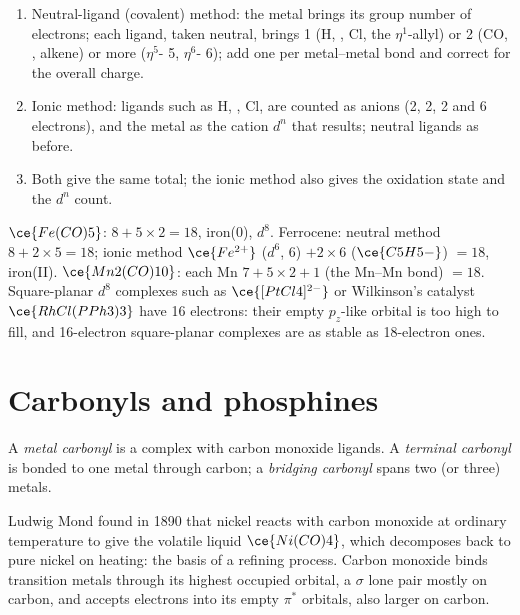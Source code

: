 \begin{method}\label{met:b3:organometallic-bonding:count}
\begin{enumerate}
  \item Neutral-ligand (covalent) method: the metal brings its group number of
        electrons; each ligand, taken neutral, brings 1 (H, , Cl, the
        $\eta^1$-allyl) or 2 (CO, , alkene) or more ($\eta^5$- 5, $\eta^6$- 6); add one per
        metal--metal bond and correct for the overall charge.
  \item Ionic method: ligands such as H, , Cl,  are counted as anions (2, 2,
        2 and 6 electrons), and the metal as the cation $d^n$ that results; neutral ligands
        as before.
  \item Both give the same total; the ionic method also gives the oxidation state
        and the $d^n$ count.
\end{enumerate}
\end{method}

\begin{example}[Counting]\label{ex:b3:organometallic-bonding:count}
$\ce{Fe(CO)5}$: $8 + 5 \times 2 = 18$, iron(0), $d^8$. Ferrocene: neutral method $8 + 2 \times 5 = 18$; ionic method
$\ce{Fe^{2+}}$ ($d^6$, 6) $+ 2 \times 6$ ($\ce{C5H5-}$) $= 18$, iron(II). $\ce{Mn2(CO)10}$: each Mn $7 + 5 \times 2 + 1$ (the Mn--Mn
bond) $= 18$. Square-planar $d^8$ complexes such as $\ce{[PtCl4]^{2-}}$ or Wilkinson's catalyst
$\ce{RhCl(PPh3)3}$ have 16 electrons: their empty $p_z$-like orbital is too high to fill, and
16-electron square-planar complexes are as stable as 18-electron ones.
\end{example}

\section{Carbonyls and phosphines}

\begin{definition}\label{def:b3:organometallic-bonding:carbonyl}
A \emph{metal carbonyl} is a complex with carbon monoxide
ligands. A \emph{terminal carbonyl} is bonded to one
metal through carbon; a \emph{bridging carbonyl} spans
two (or three) metals.
\end{definition}

Ludwig Mond found in 1890 that nickel reacts with carbon monoxide at ordinary
temperature to give the volatile liquid $\ce{Ni(CO)4}$, which decomposes back to pure
nickel on heating: the basis of a refining process. Carbon monoxide binds
transition metals through its highest occupied orbital, a $\sigma$ lone pair mostly
on carbon, and accepts electrons into its empty $\pi^*$ orbitals, also larger on
carbon.

